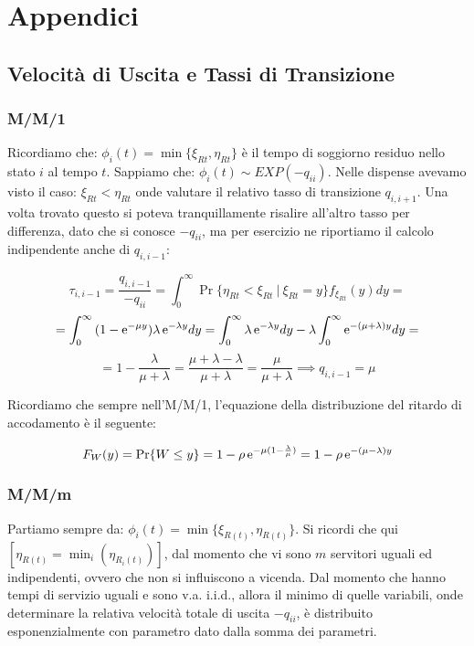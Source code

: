 
\chapter{Appendici}
\label{cap:appendix}

\section{Velocità di Uscita e Tassi di Transizione}

\subsection{M/M/1}

Ricordiamo che: $\phi_i(t) = \min\{\xi_{Rt}, \eta_{Rt}\}$ è il tempo di soggiorno residuo nello stato $i$ al tempo $t$. Sappiamo che: $\phi_i(t)\sim EXP(-q_{ii})$. Nelle dispense avevamo visto il caso: $\xi_{Rt}<\eta_{Rt}$ onde valutare il relativo tasso di transizione $q_{i,i+1}$. Una volta trovato questo si poteva tranquillamente risalire all'altro tasso per differenza, dato che si conosce $-q_{ii}$, ma per esercizio ne riportiamo il calcolo indipendente anche di $q_{i,i-1}$:

\[
	\tau_{i,i-1} = \frac{q_{i,i-1}}{-q_{ii}} = \int_0^\infty{\Pr\{\eta_{Rt}<\xi_{Rt}\ |\ \xi_{Rt}=y\}f_{\xi_{Rt}}(y)dy} =
\]
\[
	= \int_0^\infty{(1-\mathop{}\!\mathrm{e}^{-\mu y})\lambda\mathop{}\!\mathrm{e}^{-\lambda y}dy} = \int_0^\infty{\lambda\mathop{}\!\mathrm{e}^{-\lambda y}dy} - \lambda\int_0^\infty{\mathop{}\!\mathrm{e}^{-(\mu+\lambda)y}dy} =
\]
\[
	= 1-\frac{\lambda}{\mu+\lambda} = \frac{\mu+\lambda-\lambda}{\mu+\lambda} = \frac{\mu}{\mu+\lambda} \implies q_{i,i-1} = \mu 
\]

Ricordiamo che sempre nell'M/M/1, l'equazione della distribuzione del ritardo di accodamento è il seguente:

\[
	F_{W}(y) = \Pr\{W\leq y\} = 1-\rho\mathop{}\!\mathrm{e}^{-\mu(1-\frac{\lambda}{\mu})} = 1-\rho\mathop{}\!\mathrm{e}^{-(\mu-\lambda)y}
\]


\subsection{M/M/m}

Partiamo sempre da: $\phi_i(t) = \min\{\xi_{R(t)},\eta_{R(t)}\}$. Si ricordi che qui $[\eta_{R(t)}=\min_i(\eta_{R_i(t)})]$, dal momento che vi sono $m$ servitori uguali ed indipendenti, ovvero che non si influiscono a vicenda. Dal momento che hanno tempi di servizio uguali e sono v.a. i.i.d., allora il minimo di quelle variabili, onde determinare la relativa velocità totale di uscita $-q_{ii}$, è distribuito esponenzialmente con parametro dato dalla somma dei parametri.

